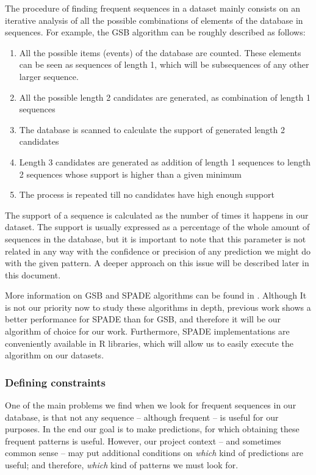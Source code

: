 \documentclass[a4paper,12pt]{article}
\begin{document}
The procedure of finding frequent sequences in a dataset mainly consists on an iterative analysis of all the possible combinations of elements of the database in sequences. For example, the GSB algorithm can be roughly described as follows:

\begin{enumerate}
\item All the possible items (events) of the database are counted. These elements can be seen as sequences of length 1, which will be subsequences of any other larger sequence.
\item All the possible length 2 candidates are generated, as combination of length 1 sequences
\item The database is scanned to calculate the support of generated length 2 candidates
\item Length 3 candidates are generated as addition of length 1 sequences to length 2 sequences whose support is higher than a given minimum
\item The process is repeated till no candidates have high enough support
\end{enumerate}

The support of a sequence is calculated as the number of times it happens in our dataset. The support is usually expressed as a percentage of the whole amount of sequences in the database, but it is important to note that this parameter is not related in any way with the confidence or precision of any prediction we might do with the given pattern. A deeper approach on this issue will be described later in this document.

More information on GSB and SPADE algorithms can be found in \cite{zaki2001spade, zhao2003sequential, srikant1996mining}. Although It is not our priority now to study these algorithms in depth, previous work shows a better performance for SPADE than for GSB, and therefore it will be our algorithm of choice for our work. Furthermore, SPADE implementations are conveniently available in R libraries, which will allow us to easily execute the algorithm on our datasets.

\subsubsection{Defining constraints}
One of the main problems we find when we look for frequent sequences in our database, is that not any sequence -- although frequent -- is useful for our purposes. In the end our goal is to make predictions, for which obtaining these frequent patterns is useful. However, our project context -- and sometimes common sense -- may put additional conditions on \emph{which} kind of predictions are useful; and therefore, \emph{which} kind of patterns we must look for.
\end{document}
